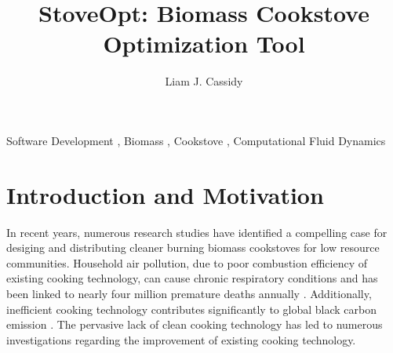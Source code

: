 \documentclass[3p,times,twocolumn]{elsarticle}
\begin{document}
\begin{frontmatter}



\dochead{}

\title{StoveOpt: Biomass Cookstove Optimization Tool}


\author{Liam J. Cassidy}

\address{2000 SW Monroe Ave, 342 Rogers Hall, Covallis, OR 97331}


\begin{abstract}
\end{abstract}

\begin{keyword}


Software Development \sep%
Biomass \sep%
Cookstove \sep%
Computational Fluid Dynamics
\end{keyword}


\end{frontmatter}


\section{Introduction and Motivation}
In recent years, numerous research studies have identified a compelling case for desiging and distributing cleaner burning biomass cookstoves for low resource communities. Household air pollution, due to poor combustion efficiency of existing cooking technology, can cause chronic respiratory conditions and has been linked to nearly four million premature deaths annually \cite{Nordica}. Additionally, inefficient cooking technology contributes significantly to global black carbon emission \cite{Bond}. The pervasive lack of clean cooking technology has led to numerous investigations regarding the improvement of existing cooking technology.
\end{document}
